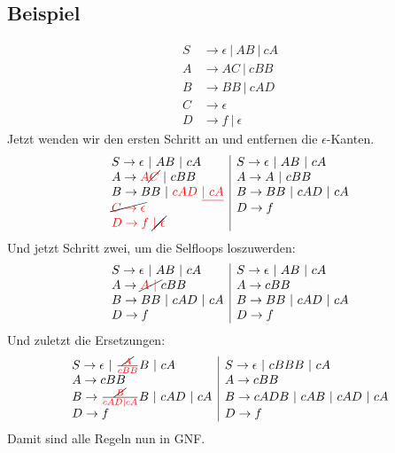 \documentclass{article}
\begin{document}
\subsection*{Beispiel}
\begin{align*}
S &\rightarrow \epsilon \ |\ AB \ |\ cA\\
A &\rightarrow AC \ |\ cBB\\
B &\rightarrow BB\ |\ cAD\\
C &\rightarrow \epsilon\\
D &\rightarrow f \ |\ \epsilon
\end{align*}
Jetzt wenden wir den ersten Schritt an und entfernen die $\epsilon$-Kanten.
\begin{align*}
\begin{array}{l|l}
S \rightarrow \epsilon \ |\ AB \ |\ cA                                 & S \rightarrow \epsilon \ |\ AB \ |\ cA \\ 
A \rightarrow {\color{red}A}\text{\cancel{\color{red}$C$}} \ |\ cBB    & A \rightarrow A\ |\ cBB                \\
B \rightarrow BB\ |\ {\color{red}cAD\ \underline{|\ cA}}               & B \rightarrow BB\ |\ cAD\ |\ cA        \\
\text{\cancel{${\color{red}C \rightarrow \epsilon}$}}                  & D \rightarrow f                        \\
{\color{red}D \rightarrow f}\ \text{\cancel{\color{red}$|\ \epsilon$}} & 
\end{array}
\end{align*}
Und jetzt Schritt zwei, um die Selfloops loszuwerden:
\begin{align*}
\begin{array}{l|l}
S \rightarrow \epsilon \ |\ AB \ |\ cA               & S \rightarrow \epsilon \ |\ AB \ |\ cA \\
A \rightarrow \text{\cancel{\color{red}$A\ |\ $}}cBB & A \rightarrow cBB                      \\
B \rightarrow BB\ |\ cAD\ |\ cA                      & B \rightarrow BB\ |\ cAD\ |\ cA        \\
D \rightarrow f                                      & D \rightarrow f
\end{array}
\end{align*}
Und zuletzt die Ersetzungen:
\begin{align*}
\begin{array}{l|l}
S \rightarrow \epsilon \ |\ \frac{\text{\cancel{\color{red}$A$}}}{\color{red}cBB}B \ |\ cA & S \rightarrow \epsilon \ |\ cBBB \ |\ cA  \\
A \rightarrow cBB                                                                          & A \rightarrow cBB                         \\
B \rightarrow \frac{\text{\cancel{\color{red}$B$}}}{\color{red}cAD|cA}B\ |\ cAD\ |\ cA     & B \rightarrow cADB\ |\ cAB\ |\ cAD\ |\ cA \\
D \rightarrow f                                                                            & D \rightarrow f
\end{array}
\end{align*}
Damit sind alle Regeln nun in GNF.
\end{document}
